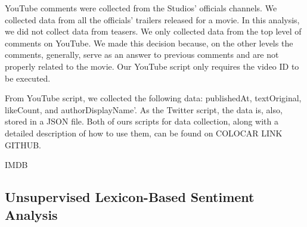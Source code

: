 YouTube comments were collected from the Studios' officials channels. We collected data from all the officials' trailers released for a movie. In this analysis, we did not collect data from teasers. We only collected data from the top level of comments on YouTube. We made this decision because, on the other levels the comments, generally, serve as an answer to previous comments and are not properly related to the movie. Our YouTube script only requires the video ID to be executed.

From YouTube script, we collected the following data: 
publishedAt, textOriginal, likeCount, and authorDisplayName'. As the Twitter script, the data is, also, stored in a JSON file.
Both of ours scripts for data collection, along with a detailed description of how to use them, can be found on COLOCAR LINK GITHUB. 


IMDB

\subsection{Unsupervised Lexicon-Based Sentiment Analysis}


